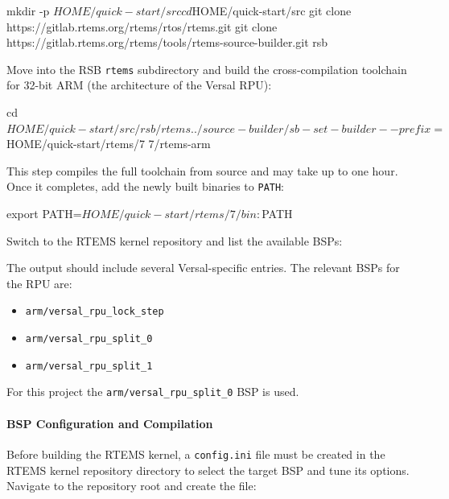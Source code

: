 \documentclass[
	a4paper,
]{CSMakotoTechnicalReport}
\begin{document}
\begin{bashcode}
mkdir -p $HOME/quick-start/src
cd $HOME/quick-start/src
git clone https://gitlab.rtems.org/rtems/rtos/rtems.git
git clone https://gitlab.rtems.org/rtems/tools/rtems-source-builder.git rsb
\end{bashcode}

Move into the RSB \texttt{rtems} subdirectory and build the cross-compilation toolchain for 32-bit ARM (the architecture of the Versal RPU):

\begin{bashcode}
cd $HOME/quick-start/src/rsb/rtems
../source-builder/sb-set-builder --prefix=$HOME/quick-start/rtems/7 7/rtems-arm
\end{bashcode}

This step compiles the full toolchain from source and may take up to one hour.
Once it completes, add the newly built binaries to \texttt{PATH}:

\begin{bashcode}
export PATH=$HOME/quick-start/rtems/7/bin:$PATH
\end{bashcode}

Switch to the RTEMS kernel repository and list the available BSPs:


The output should include several Versal-specific entries.
The relevant BSPs for the RPU are:

\begin{itemize}
    \item \texttt{arm/versal\_rpu\_lock\_step}
    \item \texttt{arm/versal\_rpu\_split\_0}
    \item \texttt{arm/versal\_rpu\_split\_1}
\end{itemize}

For this project the \texttt{arm/versal\_rpu\_split\_0} BSP is used.

\paragraph*{BSP Configuration and Compilation}

Before building the RTEMS kernel, a \texttt{config.ini} file must be created in the RTEMS kernel repository directory to select the target BSP and tune its options.
Navigate to the repository root and create the file:
\end{document}
